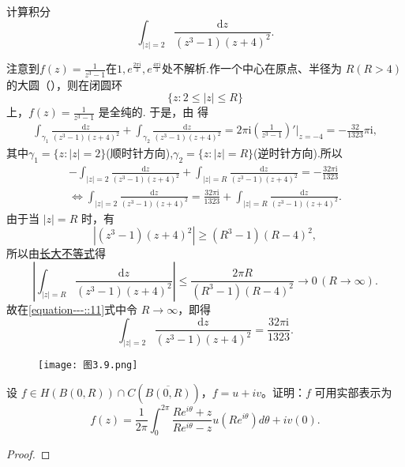 \documentclass[../../main.tex]{subfiles}
\begin{document}
\begin{example}
计算积分
\[
\int_{|z| = 2} \frac{\mathrm{d}z}{(z^3 - 1)(z + 4)^2}.
\]
\end{example}
\begin{solution}
注意到\( f(z) = \frac{1}{z^3 - 1} \)在$1,e^{\frac{2\pi \mathrm{i}}{3}},e^{\frac{4\pi \mathrm{i}}{3}}$处不解析.作一个中心在原点、半径为 \( R(R > 4) \) 的大圆（），则在闭圆环
\[
\{z: 2 \leqslant |z| \leqslant R\}
\]
上，\( f(z) = \frac{1}{z^3 - 1} \) 是全纯的. 于是，由 得
\begin{align*}
\int_{\gamma_1} \frac{\mathrm{d}z}{(z^3 - 1)(z + 4)^2} + \int_{\gamma_2} \frac{\mathrm{d}z}{(z^3 - 1)(z + 4)^2} 
= 2\pi \mathrm{i} \left( \frac{1}{z^3 - 1} \right)' \bigg|_{z = -4} = -\frac{32}{1323}\pi \mathrm{i},
\end{align*}
其中$\gamma_1=\{z:|z|=2\}$(顺时针方向),$\gamma_2=\{z:|z|=R\}$(逆时针方向).所以
\begin{align}
-\int_{|z|=2}{\frac{\mathrm{d}z}{(z^3-1)(z+4)^2}}+\int_{|z|=R}{\frac{\mathrm{d}z}{(z^3-1)(z+4)^2}}=-\frac{32\pi \mathrm{i}}{1323} \nonumber
\\
\Longleftrightarrow \int_{|z|=2}{\frac{\mathrm{d}z}{(z^3-1)(z+4)^2}}=\frac{32\pi \mathrm{i}}{1323}+\int_{|z|=R}{\frac{\mathrm{d}z}{(z^3-1)(z+4)^2}}.\label{equation---::11}
\end{align}
由于当 \( |z| = R \) 时，有
\[
|(z^3 - 1)(z + 4)^2| \geqslant (R^3 - 1)(R - 4)^2,
\]
所以由\hyperref[proposition:长大不等式]{长大不等式}得
\[
\left| \int_{|z| = R} \frac{\mathrm{d}z}{(z^3 - 1)(z + 4)^2} \right| \leqslant \frac{2\pi R}{(R^3 - 1)(R - 4)^2} \to 0 \, (R \to \infty).
\]
故在\eqref{equation---::11}式中令 \( R \to \infty \)，即得
\[
\int_{|z| = 2} \frac{\mathrm{d}z}{(z^3 - 1)(z + 4)^2} = \frac{32\pi \mathrm{i}}{1323}.
\]
\begin{figure}[H]
\centering
\texttt{[image: 图3.9.png]}
\caption{}
\label{figure:图3.9}
\end{figure}

\end{solution}

\begin{theorem}[Schwarz积分公式]\label{theorem:Schwarz积分公式}
设 \( f \in H(B(0,R)) \cap C(\overline{B(0,R)}) \)，\( f = u + iv \)。证明：\( f \) 可用实部表示为
\[
f(z) = \frac{1}{2\pi} \int_{0}^{2\pi} \frac{Re^{i\theta} + z}{Re^{i\theta} - z} u(Re^{i\theta}) d\theta + iv(0).
\]
\end{theorem}
\begin{proof}


\end{proof}
\end{document}
